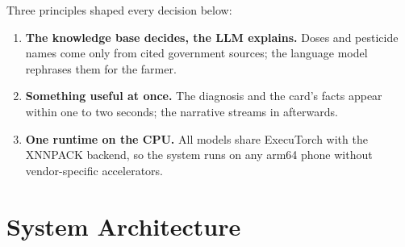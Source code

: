 \documentclass[11pt,a4paper]{article}
\begin{document}
Three principles shaped every decision below:
\begin{enumerate}
\item \textbf{The knowledge base decides, the LLM explains.} Doses and pesticide names come only from cited government
sources; the language model rephrases them for the farmer.
\item \textbf{Something useful at once.} The diagnosis and the card's facts appear within one to two seconds; the narrative
streams in afterwards.
\item \textbf{One runtime on the CPU.} All models share ExecuTorch with the XNNPACK backend, so the system runs on any
arm64 phone without vendor-specific accelerators.
\end{enumerate}

\section{System Architecture}
\end{document}
